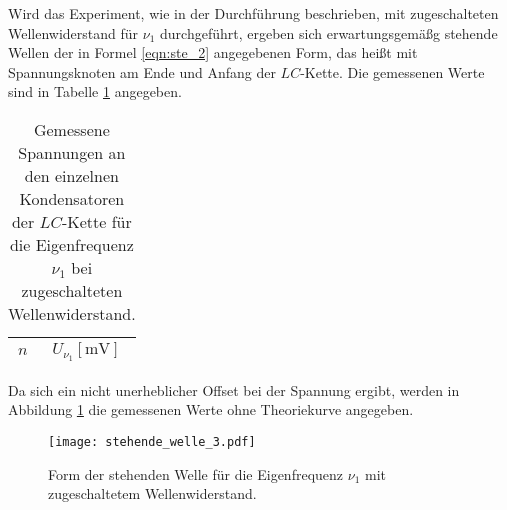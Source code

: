 Wird das Experiment, wie in der Durchführung beschrieben, mit zugeschalteten Wellenwiderstand für $\nu_1$ durchgeführt, ergeben sich erwartungsgemäßg stehende Wellen der in Formel \ref{eqn:ste_2} angegebenen Form, das heißt mit Spannungsknoten am Ende und Anfang der $LC$-Kette.
Die gemessenen Werte sind in Tabelle \ref{tab:stehend2} angegeben.
\begin{table}[H]
  \centering
  \caption{Gemessene Spannungen an den einzelnen Kondensatoren der $LC$-Kette für die Eigenfrequenz $\nu_1$ bei zugeschalteten Wellenwiderstand.}
  \label{tab:stehend2}
  \begin{tabular}{c c}
    \toprule
    {$n$} & {$U_{\nu_1} [\si{\milli\volt}]$}\\
    \midrule
    
    \bottomrule
  \end{tabular}
\end{table}
Da sich ein nicht unerheblicher Offset bei der Spannung ergibt, werden in Abbildung \ref{fig:stehend3} die gemessenen Werte ohne Theoriekurve angegeben.

\begin{figure}[H]
  \centering
  \texttt{[image: stehende\_welle\_3.pdf]}
  \caption{Form der stehenden Welle für die Eigenfrequenz $\nu_1$ mit zugeschaltetem Wellenwiderstand.}
  \label{fig:stehend3}
\end{figure}
